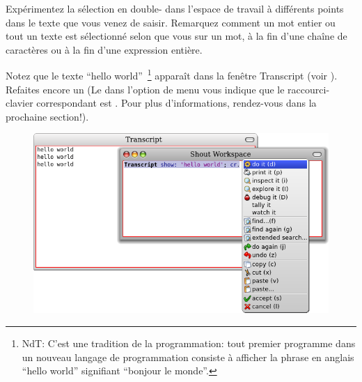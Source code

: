 \documentclass[a4paper,10pt,twoside]{book}
\begin{document}
Expérimentez la sélection en double-\clickant{} dans l'espace de travail 
à différents points dans le texte que vous venez de saisir.
Remarquez comment un mot entier ou tout un texte est sélectionné 
selon que vous \clickz{} sur un mot, à la fin d'une chaîne de
caractères ou à la fin d'une expression entière.


Notez que le texte ``hello world''~\footnote{NdT: C'est une tradition de la
programmation: tout premier programme dans un nouveau langage de
programmation consiste à afficher la phrase en anglais ``hello world''
signifiant ``bonjour le monde''.}
apparaît dans la fenêtre Transcript (voir ).
Refaites encore un 
(Le  dans l'option de menu  vous indique que
le raccourci-clavier correspondant est . Pour plus
d'informations, rendez-vous dans la prochaine section!).

\begin{figure}[htb]
\ifluluelse
	{\centerline {\includegraphics[width=\textwidth]{HelloWorld}}}
\caption{}
\end{figure}

\end{document}
